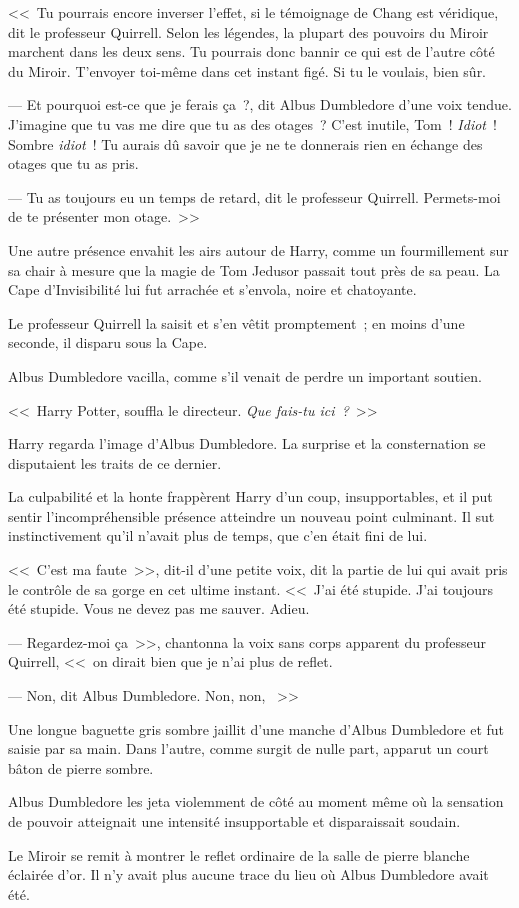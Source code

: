 <<~Tu pourrais encore inverser l'effet, si le témoignage de Chang est véridique, dit le professeur Quirrell. Selon les légendes, la plupart des pouvoirs du Miroir marchent dans les deux sens. Tu pourrais donc bannir ce qui est de l'autre côté du Miroir. T'envoyer toi-même dans cet instant figé. Si tu le voulais, bien sûr.

--- Et pourquoi est-ce que je ferais ça~?, dit Albus Dumbledore d'une voix tendue. J'imagine que tu vas me dire que tu as des otages~? C'est inutile, Tom~! \emph{Idiot}~! Sombre \emph{idiot}~! Tu aurais dû savoir que je ne te donnerais rien en échange des otages que tu as pris.

--- Tu as toujours eu un temps de retard, dit le professeur Quirrell. Permets-moi de te présenter mon otage.~>>

Une autre présence envahit les airs autour de Harry, comme un fourmillement sur sa chair à mesure que la magie de Tom Jedusor passait tout près de sa peau. La Cape d'Invisibilité lui fut arrachée et s'envola, noire et chatoyante.

Le professeur Quirrell la saisit et s'en vêtit promptement~; en moins d'une seconde, il disparu sous la Cape.

Albus Dumbledore vacilla, comme s'il venait de perdre un important soutien.

<<~Harry Potter, souffla le directeur. \emph{Que fais-tu ici~?}~>>

Harry regarda l'image d'Albus Dumbledore. La surprise et la consternation se disputaient les traits de ce dernier.

La culpabilité et la honte frappèrent Harry d'un coup, insupportables, et il put sentir l'incompréhensible présence atteindre un nouveau point culminant. Il sut instinctivement qu'il n'avait plus de temps, que c'en était fini de lui.

<<~C'est ma faute~>>, dit-il d'une petite voix, dit la partie de lui qui avait pris le contrôle de sa gorge en cet ultime instant. <<~J'ai été stupide. J'ai toujours été stupide. Vous ne devez pas me sauver. Adieu.

--- Regardez-moi ça~>>, chantonna la voix sans corps apparent du professeur Quirrell, <<~on dirait bien que je n'ai plus de reflet.

--- Non, dit Albus Dumbledore. Non, non, ~>>~

Une longue baguette gris sombre jaillit d'une manche d'Albus Dumbledore et fut saisie par sa main. Dans l'autre, comme surgit de nulle part, apparut un court bâton de pierre sombre.

Albus Dumbledore les jeta violemment de côté au moment même où la sensation de pouvoir atteignait une intensité insupportable et disparaissait soudain.

Le Miroir se remit à montrer le reflet ordinaire de la salle de pierre blanche éclairée d'or. Il n'y avait plus aucune trace du lieu où Albus Dumbledore avait été.
